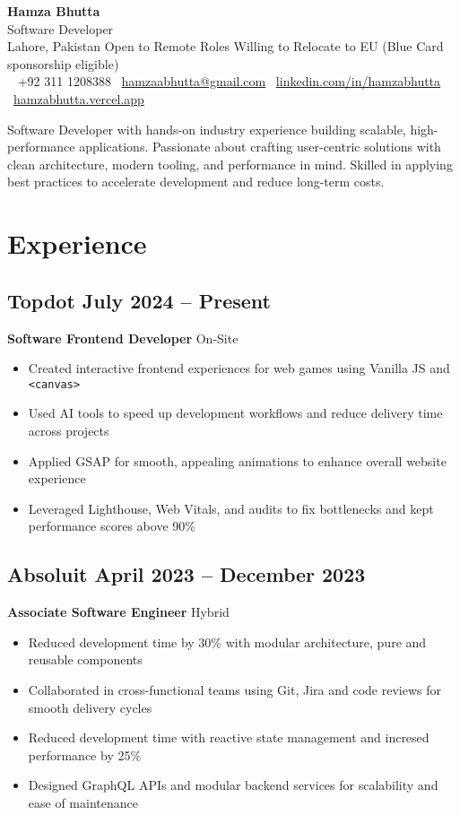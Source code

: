 \documentclass[11pt]{article}
\makeatletter
\newcommand{\bodyfontsize}{\small} %
\newcommand{\headerfontsize}{\huge} %
\newcommand{\resumeHeader}[6]{ %
    \begin{center}
        \vspace*{10pt}
        {\headerfontsize\bfseries\color{headercolor} #1} \\[8pt]
      {\large\color{headercolor} Software Developer} \\[4pt]
{\bodyfontsize\color{headercolor} #6} \\[8pt]
        {\normalsize\color{headercolor}
            \faPhone~ {+92 311 1208388} {}
            \faEnvelope~\href{mailto:hamzaabhutta@gmail.com}{hamzaabhutta@gmail.com}  {}
            \faLinkedin~\href{https://www.linkedin.com/in/hamzabhutta}{linkedin.com/in/hamzabhutta} {}
            \faGlobe~\href{https://hamzabhutta.vercel.app/}{hamzabhutta.vercel.app}
        } \\[10pt]
        \parbox{0.9\textwidth}{\centering\small\color{black}#5} %
        \vspace{10pt}
    \end{center}
}
\makeatother
\begin{document}
\pagestyle{empty} %
\RaggedRight %

\resumeHeader{Hamza Bhutta}{}{}{}{
Software Developer with hands-on industry experience building scalable, high-performance applications. Passionate about crafting user-centric solutions with clean architecture, modern tooling, and performance in mind. Skilled in applying best practices to accelerate development and reduce long-term costs.
}
{Lahore, Pakistan \textbar{} Open to Remote Roles \textbar{} Willing to Relocate to EU (Blue Card sponsorship eligible)}


\section{Experience}
\subsection{\texorpdfstring{Topdot \hfill July 2024 -- Present}{Topdot, July 2024 -- Present}}  
\textbf{Software Frontend Developer} \hfill On-Site  
\begin{itemize}
\item Created interactive frontend experiences for web games using Vanilla JS and \texttt{<canvas>}
\item Used AI tools to speed up development workflows and reduce delivery time across projects  
\item Applied GSAP for smooth, appealing animations to enhance overall website experience  
\item Leveraged Lighthouse, Web Vitals, and audits to fix bottlenecks and kept performance scores above 90\%  
\end{itemize}

\subsection{\texorpdfstring{Absoluit \hfill April 2023 -- December 2023}{Absoluit, April 2023 -- December 2023}}
\textbf{Associate Software Engineer} \hfill Hybrid  
\begin{itemize}
\item Reduced development time by 30\% with modular architecture, pure and reusable components
\item Collaborated in cross-functional teams using Git, Jira and code reviews for smooth delivery cycles  
\item Reduced development time with reactive state management and incresed performance by 25\%
\item Designed GraphQL APIs and modular backend services for scalability and ease of maintenance  
\end{itemize}
\end{document}

